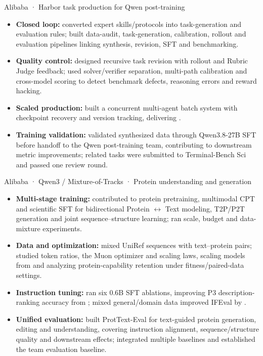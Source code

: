 {Alibaba · Harbor task production for Qwen post-training}
\begin{itemize}
  \item \textbf{Closed loop:} converted expert skills/protocols into task-generation and evaluation rules; built data-audit, task-generation, calibration, rollout and evaluation pipelines linking synthesis, revision, SFT and benchmarking.
  \item \textbf{Quality control:} designed recursive task revision with rollout and Rubric Judge feedback; used solver/verifier separation, multi-path calibration and cross-model scoring to detect benchmark defects, reasoning errors and reward hacking.
  \item \textbf{Scaled production:} built a concurrent multi-agent batch system with checkpoint recovery and version tracking, delivering .
  \item \textbf{Training validation:} validated synthesized data through Qwen3.8-27B SFT before handoff to the Qwen post-training team, contributing to downstream metric improvements; related tasks were submitted to Terminal-Bench Sci and passed one review round.
\end{itemize}
\projectspace
{}
{Alibaba · Qwen3 / Mixture-of-Tracks · Protein understanding and generation}
\begin{itemize}
  \item \textbf{Multi-stage training:} contributed to protein pretraining, multimodal CPT and scientific SFT for bidirectional Protein $\leftrightarrow$ Text modeling, T2P/P2T generation and joint sequence--structure learning; ran scale, budget and data-mixture experiments.
  \item \textbf{Data and optimization:} mixed UniRef sequences with text--protein pairs; studied token ratios, the Muon optimizer and scaling laws, scaling models from  and analyzing protein-capability retention under fitness/paired-data settings.
  \item \textbf{Instruction tuning:} ran six 0.6B SFT ablations, improving P3 description-ranking accuracy from ; mixed general/domain data improved IFEval by .
  \item \textbf{Unified evaluation:} built ProtText-Eval for text-guided protein generation, editing and understanding, covering instruction alignment, sequence/structure quality and downstream effects; integrated multiple baselines and established the team evaluation baseline.
\end{itemize}
